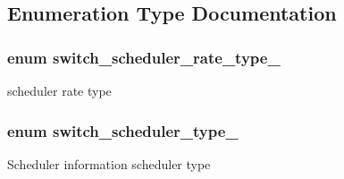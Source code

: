 \subsection{Enumeration Type Documentation}
\hypertarget{group__Scheduler_gabdcb6853f591a9102e7a108eb4d7b331}{
\subsubsection[{switch\+\_\+scheduler\+\_\+rate\+\_\+type\+\_\+}]{\setlength{\rightskip}{0pt plus 5cm}enum {\bf switch\+\_\+scheduler\+\_\+rate\+\_\+type\+\_\+}}}\label{group__Scheduler_gabdcb6853f591a9102e7a108eb4d7b331}
scheduler rate type \hypertarget{group__Scheduler_gab958915b2985910d70073c1f50f1db2c}{
\subsubsection[{switch\+\_\+scheduler\+\_\+type\+\_\+}]{\setlength{\rightskip}{0pt plus 5cm}enum {\bf switch\+\_\+scheduler\+\_\+type\+\_\+}}}\label{group__Scheduler_gab958915b2985910d70073c1f50f1db2c}
Scheduler information scheduler type 

